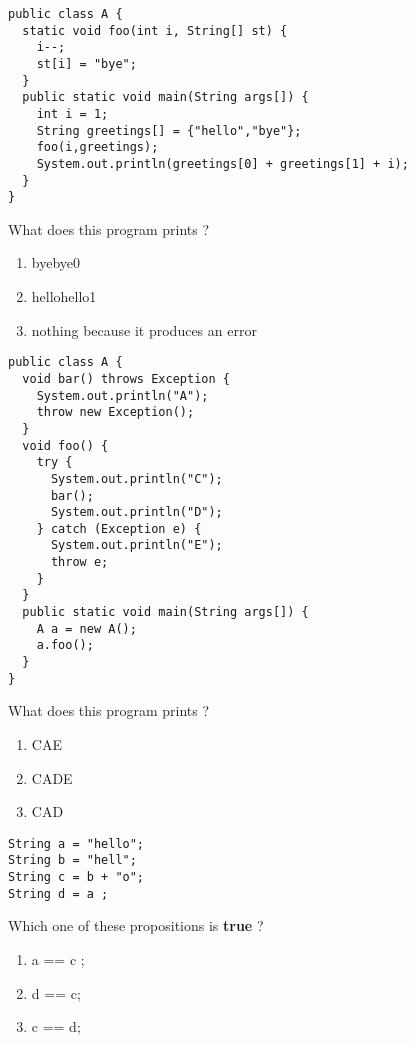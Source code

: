 \documentclass[correction]{exercices}
\begin{document}
\begin{question} \hfill
\begin{verbatim}
public class A {
  static void foo(int i, String[] st) {
    i--;
    st[i] = "bye";
  }
  public static void main(String args[]) {
    int i = 1;
    String greetings[] = {"hello","bye"};
    foo(i,greetings);
    System.out.println(greetings[0] + greetings[1] + i);
  }
}
\end{verbatim}

What does this program prints ?
\begin{multicols}{2}
\begin{enumerate}
\item byebye0
\item hellohello1
\item nothing because it produces an error
\end{enumerate}
\end{multicols}
\end{question}

\begin{question} \hfill
\begin{verbatim}
public class A {
  void bar() throws Exception {
    System.out.println("A");
    throw new Exception();
  }
  void foo() {
    try {
      System.out.println("C");
      bar();
      System.out.println("D");
    } catch (Exception e) {
      System.out.println("E");
      throw e;
    }
  }
  public static void main(String args[]) {
    A a = new A();
    a.foo();
  }
}
\end{verbatim}

What does this program prints ?
\begin{multicols}{2}
\begin{enumerate}
\item CAE
\item CADE
\item CAD
\end{enumerate}
\end{multicols}
\end{question}

\begin{question} \hfill
\begin{verbatim}
String a = "hello";
String b = "hell";
String c = b + "o";
String d = a ;
\end{verbatim}

Which one of these propositions is \textbf{true} ?

\begin{multicols}{2}
\begin{enumerate}
\item a == c
;
\item d == c;
\item c == d;
\end{enumerate}
\end{multicols}
\end{question}
\end{document}

